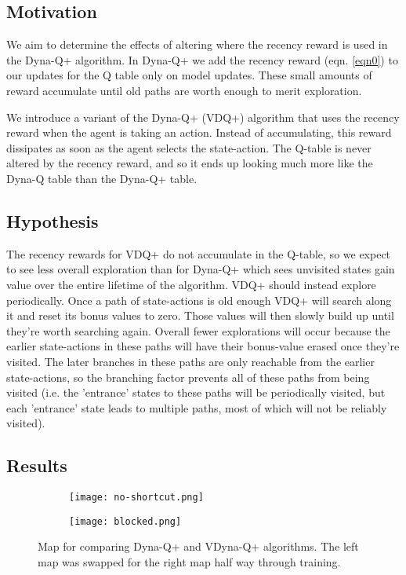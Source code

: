 \documentclass{article}
\begin{document}
\subsection{Motivation}
We aim to determine the effects of altering where the recency reward is used in the Dyna-Q+ algorithm. In Dyna-Q+ we add the recency reward (eqn. \ref{eqn0}) to our updates for the Q table only on model updates. These small amounts of reward accumulate until old paths are worth enough to merit exploration. 

We introduce a variant of the Dyna-Q+ (VDQ+) algorithm that uses the recency reward when the agent is taking an action. Instead of accumulating, this reward dissipates as soon as the agent selects the state-action. The Q-table is never altered by the recency reward, and so it ends up looking much more like the Dyna-Q table than the Dyna-Q+ table. 

\subsection{Hypothesis}

The recency rewards for VDQ+ do not accumulate in the Q-table, so we expect to see less overall exploration than for Dyna-Q+ which sees unvisited states gain value over the entire lifetime of the algorithm. VDQ+ should instead explore periodically. Once a path of state-actions is old enough VDQ+ will search along it and reset its bonus values to zero. Those values will then slowly build up until they're worth searching again. Overall fewer explorations will occur because the earlier state-actions in these paths will have their bonus-value erased once they're visited. The later branches in these paths are only reachable from the earlier state-actions, so the branching factor prevents all of these paths from being visited (i.e. the 'entrance' states to these paths will be periodically visited, but each 'entrance' state leads to multiple paths, most of which will not be reliably visited). 

\subsection{Results}

\begin{figure}[H]
    \begin{subfigure}{.5\textwidth}
      \texttt{[image: no-shortcut.png]}
    \end{subfigure}
    \begin{subfigure}{.5\textwidth}
      \texttt{[image: blocked.png]}
    \end{subfigure}
    \caption{Map for comparing Dyna-Q+ and VDyna-Q+ algorithms. The left map was swapped for the right map half way through training.}
    \label{fig:graph_1}
  \end{figure}
\end{document}
